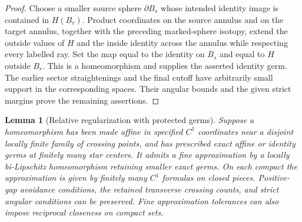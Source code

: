 \documentclass[11pt]{article}
\numberwithin{equation}{section}
\newtheorem{lemma}[theorem]{Lemma}
\theoremstyle{definition}
\theoremstyle{remark}
\begin{document}
\begin{proof}
Choose a smaller source sphere $\partial B_s$ whose intended identity
image is contained in $H(B_r)$.  Product coordinates on the source
annulus and on the target annulus, together with the preceding
marked-sphere isotopy, extend the outside values of $H$ and the
inside identity across the annulus while respecting every labelled
ray.  Set the map equal to the identity on $B_s$ and equal to $H$
outside $B_r$.  This is a homeomorphism and supplies the asserted
identity germ.  The earlier sector straightenings and the final
cutoff have arbitrarily small support in the corresponding spaces.
Their angular bounds and the given strict margins prove the
remaining assertions.
\end{proof}

\begin{lemma}[Relative regularization with protected germs]
\label{lt:relative-germs}
Suppose a homeomorphism has been made affine in specified $C^1$
coordinates near a disjoint locally finite family of crossing
points, and has prescribed exact affine or identity germs at
finitely many star centers.  It admits a fine approximation by a
locally bi-Lipschitz homeomorphism retaining smaller exact germs.
On each compact the approximation is given by finitely many $C^1$
formulas on closed pieces.  Positive-gap avoidance conditions,
the retained transverse crossing counts, and strict angular
conditions can be preserved.  Fine approximation tolerances can
also impose reciprocal closeness on compact sets.
\end{lemma}
\end{document}
